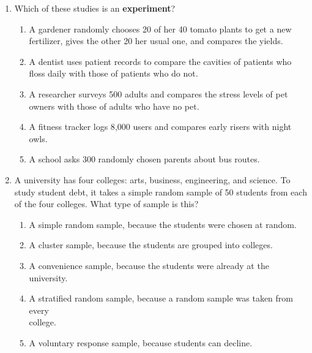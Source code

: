 \documentclass[12pt]{article}
\begin{document}
\begin{enumerate}[leftmargin=1.9em, itemsep=0.13in]
  \boxguard[14]
  \item Which of these studies is an \textbf{experiment}?
        \begin{enumerate}[label=\textbf{(\Alph*)}, leftmargin=2.2em, itemsep=2pt]
          \item A gardener randomly chooses 20 of her 40 tomato plants to get a new fertilizer,
                gives the other 20 her usual one, and compares the yields.
          \item A dentist uses patient records to compare the cavities of patients who floss
                daily with those of patients who do not.
          \item A researcher surveys 500 adults and compares the stress levels of pet owners
                with those of adults who have no pet.
          \item A fitness tracker logs 8{,}000 users and compares early risers with night owls.
          \item A school asks 300 randomly chosen parents about bus routes.\hfill{}\rule[-0.2in]{0pt}{0.48in}
        \end{enumerate}

  \boxguard[13]
  \item A university has four colleges: arts, business, engineering, and science. To study
        student debt, it takes a simple random sample of 50 students from each of the four
        colleges. What type of sample is this?
        \begin{enumerate}[label=\textbf{(\Alph*)}, leftmargin=2.2em, itemsep=2pt]
          \item A simple random sample, because the students were chosen at random.
          \item A cluster sample, because the students are grouped into colleges.
          \item A convenience sample, because the students were already at the university.
          \item A stratified random sample, because a random sample was taken from every\\
                college.
          \item A voluntary response sample, because students can decline.\hfill{}\rule[-0.2in]{0pt}{0.48in}
        \end{enumerate}


\end{enumerate}
\end{document}
